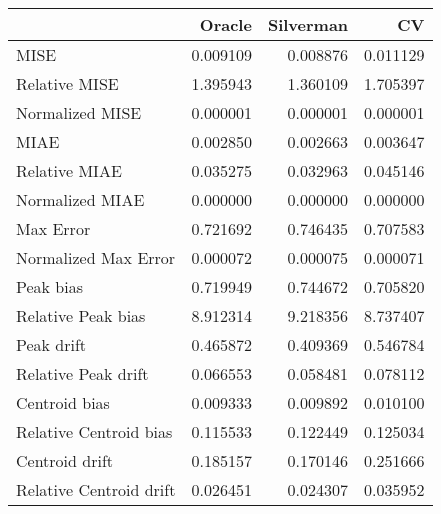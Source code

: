 \begin{tabular}{lrrr}
  \hline
 & Oracle & Silverman & CV \\ 
  \hline
MISE & 0.009109 & 0.008876 & 0.011129 \\ 
  Relative MISE & 1.395943 & 1.360109 & 1.705397 \\ 
  Normalized MISE & 0.000001 & 0.000001 & 0.000001 \\ 
  MIAE & 0.002850 & 0.002663 & 0.003647 \\ 
  Relative MIAE & 0.035275 & 0.032963 & 0.045146 \\ 
  Normalized MIAE & 0.000000 & 0.000000 & 0.000000 \\ 
  Max Error & 0.721692 & 0.746435 & 0.707583 \\ 
  Normalized Max Error & 0.000072 & 0.000075 & 0.000071 \\ 
  Peak bias & 0.719949 & 0.744672 & 0.705820 \\ 
  Relative Peak bias & 8.912314 & 9.218356 & 8.737407 \\ 
  Peak drift & 0.465872 & 0.409369 & 0.546784 \\ 
  Relative Peak drift & 0.066553 & 0.058481 & 0.078112 \\ 
  Centroid bias & 0.009333 & 0.009892 & 0.010100 \\ 
  Relative Centroid bias & 0.115533 & 0.122449 & 0.125034 \\ 
  Centroid drift & 0.185157 & 0.170146 & 0.251666 \\ 
  Relative Centroid drift & 0.026451 & 0.024307 & 0.035952 \\ 
   \hline
\end{tabular}
